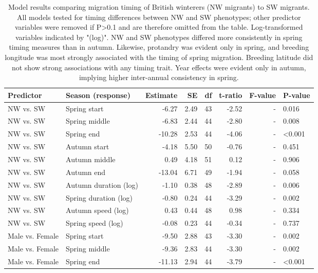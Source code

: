 \documentclass[a4paper, nobind]{templates/ociamthesis}
\begin{document}
\begin{table}[t]

\caption{\label{tab:nw-timing-table}Model results comparing migration timing of British winterers (NW migrants) to SW migrants. All models tested for timing differences between NW and SW phenotypes; other predictor variables were removed if P>0.1 and are therefore omitted from the table. Log-transformed variables indicated by  "(log)". NW and SW phenotypes differed more consistently in spring timing measures than in autumn. Likewise, protandry was evident only in spring, and breeding longitude was most strongly associated with the timing of spring migration. Breeding latitude did not show strong associations with any timing trait. Year effects were evident only in autumn, implying higher inter-annual consistency in spring.}
\centering
\fontsize{9.5}{11.5}\selectfont
\begin{tabular}{l|l|r|r|r|r|r|l}
\hline
Predictor & Season (response) & Estimate & SE & df & t-ratio & F-value & P-value\\
\hline
NW vs. SW & Spring start & -6.27 & 2.49 & 43 & -2.52 & - & 0.016\\
\hline
NW vs. SW & Spring middle & -6.83 & 2.44 & 44 & -2.80 & - & 0.008\\
\hline
NW vs. SW & Spring end & -10.28 & 2.53 & 44 & -4.06 & - & <0.001\\
\hline
NW vs. SW & Autumn start & -4.18 & 5.50 & 50 & -0.76 & - & 0.451\\
\hline
NW vs. SW & Autumn middle & 0.49 & 4.18 & 51 & 0.12 & - & 0.906\\
\hline
NW vs. SW & Autumn end & -13.04 & 6.71 & 49 & -1.94 & - & 0.058\\
\hline
NW vs. SW & Autumn duration (log) & -1.10 & 0.38 & 48 & -2.89 & - & 0.006\\
\hline
NW vs. SW & Spring duration (log) & -0.80 & 0.24 & 44 & -3.29 & - & 0.002\\
\hline
NW vs. SW & Autumn speed (log) & 0.43 & 0.44 & 48 & 0.98 & - & 0.334\\
\hline
NW vs. SW & Spring speed (log) & -0.08 & 0.23 & 44 & -0.34 & - & 0.737\\
\hline
Male vs. Female & Spring start & -9.50 & 2.88 & 43 & -3.30 & - & 0.002\\
\hline
Male vs. Female & Spring middle & -9.36 & 2.83 & 44 & -3.30 & - & 0.002\\
\hline
Male vs. Female & Spring end & -11.13 & 2.94 & 44 & -3.79 & - & <0.001\\

\end{tabular}
\end{table}
\end{document}
